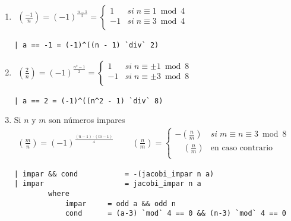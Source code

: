 \documentclass[10pt,spanish]{article}
\begin{document}
\begin{enumerate}[1.]
\item
\begin{equation*}
    \begin{aligned}
    \left( \frac{-1}{n} \right) = (-1)^{\frac{n-1}{2}} = \begin{cases}
        1 & si \;n \equiv 1 \bmod 4 \\
        -1 & si \;n \equiv 3 \bmod 4\\
        \end{cases}
    \end{aligned}
    \phantom{\hspace{18cm}}
\end{equation*}

\begin{verbatim}
| a == -1 = (-1)^((n - 1) `div` 2)
\end{verbatim}

\item
\begin{equation*}
    \begin{aligned}
    \left( \frac{2}{n} \right) = (-1)^{\frac{n^2-1}{2}} = \begin{cases}
        1 & si \;n \equiv \pm 1 \bmod 8 \\
        -1 & si \;n \equiv \pm 3 \bmod 8\\
        \end{cases}
    \end{aligned}
    \phantom{\hspace{18cm}}
\end{equation*}

\begin{verbatim}
| a == 2 = (-1)^((n^2 - 1) `div` 8)
\end{verbatim}

\item Si $n$ y $m$ son números impares
\begin{equation*}
    \begin{aligned}
    \left( \frac{m}{n} \right) = (-1)^{\frac{(n-1)\cdot(m-1)}{4}} \qquad\ \left( \frac{n}{m} \right) = \begin{cases}
        - \left( \frac{n}{m} \right) & si \;m \equiv n \equiv 3 \bmod 8 \\
        \quad\left( \frac{n}{m} \right) & \text{en caso contrario}\\
        \end{cases}
    \end{aligned}
    \phantom{\hspace{18cm}}
\end{equation*}

\begin{verbatim}
| impar && cond           = -(jacobi_impar n a)
| impar                   = jacobi_impar n a
        where
            impar     = odd a && odd n 
            cond      = (a-3) `mod` 4 == 0 && (n-3) `mod` 4 == 0
\end{verbatim}
\end{enumerate}
\end{document}
